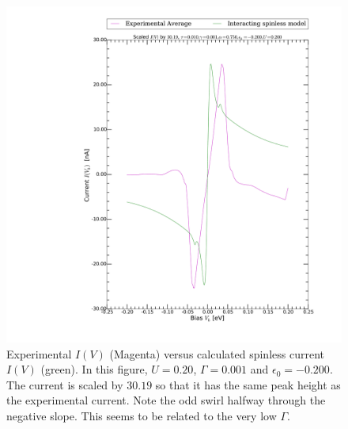 \begin{figure}[h]
    \centering
    \includegraphics[width=.95\textwidth, clip=true, trim=11cm 2cm 2cm 0cm]{pdf/fit/fit_spinless_1.pdf}
    \caption{Experimental $I(V)$ (Magenta) versus calculated spinless current $I(V)$ (green). In this figure, $U=0.20$, $\Gamma=0.001$ and $\epsilon_0 = -0.200$. The current is scaled by $30.19$ so that it has the same peak height as the experimental current. Note the odd swirl halfway through the negative slope. This seems to be related to the very low $\Gamma$.}
    \label{fig:fitspinless1}
\end{figure}
